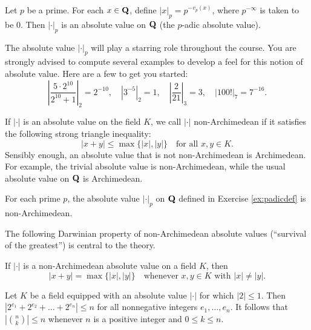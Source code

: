 \begin{prob}\label{ex:padicdef}\label{prob:03} Let $p$ be a prime. For each $x \in \mathbf{Q}$, define $|x|_{p} = p^{-v_p(x)}$, where $p^{-\infty}$ is taken to be $0$. Then $|\cdot|_{p}$ is an absolute value on $\mathbf{Q}$ (the \textsf{$p$-adic absolute value}).
\end{prob}

The absolute value $|\cdot|_{p}$ will play a starring role throughout the course. You are strongly advised to compute several examples to develop a feel for this notion of absolute value. Here are a few to get you started:
\[ \left|\frac{5\cdot 2^{10}}{2^{10}   +1}\right|_{2} = 2^{-10}, \quad |3^{-5}|_{2} = 1, \quad \left|\frac{2}{21}\right|_{3}=3, \quad |100!|_{7} = 7^{-16}. \]

If $|\cdot|$ is an absolute value on the field $K$, we call $|\cdot|$ \textsf{non-Archimedean} if it satisfies the following \textsf{strong triangle inequality}:   
\[ |x+y| \le \max\{|x|, |y|\} \quad\text{for all $x, y \in K$}. \]
Sensibly enough, an absolute value that is not non-Archimedean is \textsf{Archimedean}. For example, the trivial absolute value is non-Archimedean, while the usual absolute value on $\mathbf{Q}$ is Archimedean.


\begin{prob}\label{prob:05} For each prime $p$, the absolute value $|\cdot|_{p}$ on $\mathbf{Q}$ defined in Exercise \ref{ex:padicdef} is non-Archimedean. 
\end{prob}

The following Darwinian property of non-Archimedean absolute values (``survival of the greatest'') is central to the theory.

\vspace{-0.1in}
\begin{prob}\label{prob:04} If $|\cdot|$ is a non-Archimedean absolute value on a field $K$, then
\[ |x+y| = \max\{|x|,|y|\} \quad\text{whenever $x,y\in K$ with $|x| \ne |y|$}.\]
\end{prob}



\begin{prob}\label{prob:06} Let $K$ be a field equipped with an absolute value $|\cdot|$ for which $|2| \le 1$. Then $|2^{e_1} + 2^{e_2} + \dots + 2^{e_n}| \le n$ for all nonnegative integers $e_1,\dots, e_n$. It follows that $|\binom{n}{k}| \le n$ whenever $n$ is a positive integer and $0\le k\le n$.
\end{prob}

